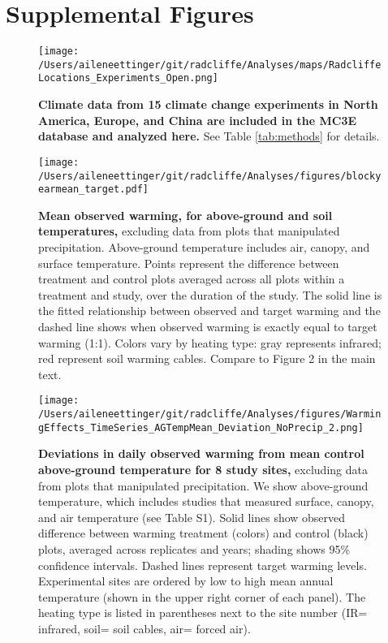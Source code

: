 \documentclass{article}
\begin{document}
\section* {Supplemental Figures}
\begin{figure}[p]
\centering
\texttt{[image: /Users/aileneettinger/git/radcliffe/Analyses/maps/RadcliffeLocations\_Experiments\_Open.png]} 
\caption{\textbf{Climate data from 15 climate change experiments in North America, Europe, and China are included in the MC3E database and analyzed here.} See Table \ref{tab:methods} for details.} 
\label{fig:map}
\end{figure}
\clearpage
\begin{figure}[h]
\centering
\texttt{[image: /Users/aileneettinger/git/radcliffe/Analyses/figures/blockyearmean\_target.pdf]}
\caption{\textbf{Mean observed warming, for above-ground and soil temperatures,} excluding data from plots that manipulated precipitation. Above-ground temperature includes air, canopy, and surface temperature. Points represent the difference between treatment and control plots averaged across all plots within a treatment and study, over the duration of the study. The solid line is the fitted relationship between observed and target warming and the dashed line shows when observed warming is exactly equal to target warming (1:1). Colors vary by heating type: gray represents infrared; red represent soil warming cables. Compare to Figure 2 in the main text.}
 \label{fig:blockyear}
 \end{figure}
\clearpage
\begin{figure}[h]
\centering
\texttt{[image: /Users/aileneettinger/git/radcliffe/Analyses/figures/WarmingEffects\_TimeSeries\_AGTempMean\_Deviation\_NoPrecip\_2.png]}
\caption{\textbf{Deviations in daily observed warming from mean control above-ground temperature for 8 study sites,} excluding data from plots that manipulated precipitation. We show above-ground temperature, which includes studies that measured surface, canopy, and air temperature (see Table S1). Solid lines show observed difference between warming treatment (colors) and control (black) plots, averaged across replicates and years; shading shows 95\% confidence intervals. Dashed lines represent target warming levels. Experimental sites are ordered by low to high mean annual temperature (shown in the upper right corner of each panel). The heating type is listed in parentheses next to the site number (IR= infrared, soil= soil cables, air= forced air).} 
\label{fig:effwarmagtemp}
\end{figure}

% 
\end{document}
